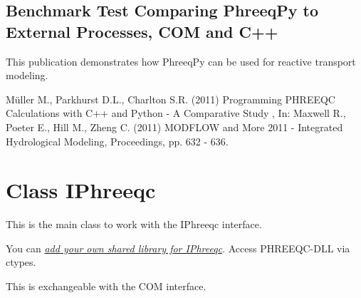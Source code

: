 \documentclass[letterpaper,10pt,english]{sphinxmanual}
\begin{document}
\section{Benchmark Test Comparing PhreeqPy to External Processes, COM and C++}
\label{index:benchmark-test-comparing-phreeqpy-to-external-processes-com-and-c}
This publication demonstrates how PhreeqPy can be used for reactive transport
modeling.

Müller M., Parkhurst D.L., Charlton S.R. (2011)
Programming PHREEQC Calculations with C++ and Python - A Comparative Study ,
In: Maxwell R., Poeter E., Hill M., Zheng C. (2011) MODFLOW and More 2011 -
Integrated Hydrological Modeling, Proceedings, pp. 632 - 636.


\chapter{Class IPhreeqc}
\label{iphreeqc:class-iphreeqc}\label{iphreeqc::doc}\label{iphreeqc:sent-us-you-email-address}
This is the main class to work with the IPhreeqc interface.

You can {\hyperref[index:installation]{\emph{add your own shared library for IPhreeqc}}}.
\label{iphreeqc:module-phreeqpy.iphreeqc.phreeqc_dll}
Access PHREEQC-DLL via ctypes.

This is exchangeable with the COM interface.
\end{document}

